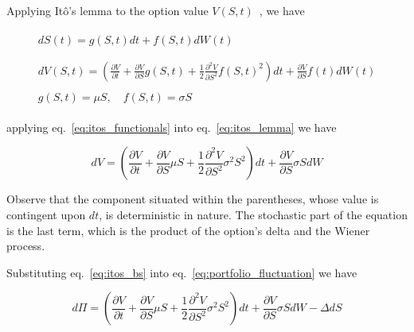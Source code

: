     Applying Itô's lemma to the option value $V(S,t)$~\cite{kuo_introduction_2006}, we have

    \begin{gather}
        \begin{split}
            dS(t)
                = g(S,t) dt + f(S,t) dW(t) \\
        \end{split}
        \label{eq:itos_process}
            \\
        \begin{split}
            dV(S, t)
                =
                    \left(
                        \frac{\partial V}{\partial t}
                        + \frac{\partial V}{\partial S} g(S,t)
                        + \frac{1}{2} \frac{\partial^2 V}{\partial S^2} f(S,t)^2
                    \right) dt
                    + \frac{\partial V}{\partial S} f(t) dW(t)
        \end{split}
        \label{eq:itos_lemma}
            \\
        \begin{split}
            g(S,t) = \mu S, \quad f(S,t) = \sigma S
        \end{split}
        \label{eq:itos_functionals}
    \end{gather}

    applying eq.~\ref{eq:itos_functionals} into eq.~\ref{eq:itos_lemma} we have

    \begin{equation}
        dV =
            \left(
                \frac{\partial V}{\partial t}
                    + \frac{\partial V}{\partial S} \mu S
                    + \frac{1}{2} \frac{\partial^2 V}{\partial S^2} \sigma^2 S^2
            \right) dt
            + \frac{\partial V}{\partial S} \sigma S dW
        \label{eq:itos_bs}
    \end{equation}

    Observe that the component situated within the parentheses, whose value is contingent upon $dt$,
    is deterministic in nature.
    The stochastic part of the equation is the last term,
    which is the product of the option's delta and the Wiener process.

    Substituting eq.~\ref{eq:itos_bs} into eq.~\ref{eq:portfolio_fluctuation} we have

    \begin{equation}
        d\Pi =
            \left(
                \frac{\partial V}{\partial t}
                    + \frac{\partial V}{\partial S} \mu S
                    + \frac{1}{2} \frac{\partial^2 V}{\partial S^2} \sigma^2 S^2
            \right) dt
            + \frac{\partial V}{\partial S} \sigma S dW
            - \Delta dS
        \label{eq:portfolio_fluctuation_bs}
    \end{equation}

